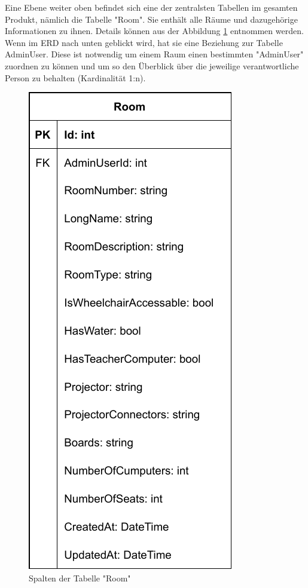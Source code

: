 
Eine Ebene weiter oben befindet sich eine der zentralsten Tabellen im gesamten Produkt, nämlich die Tabelle "Room". Sie enthält alle Räume und dazugehörige Informationen zu ihnen. Details können aus der Abbildung \ref{fig:RoomTableColls} entnommen werden. Wenn im ERD nach unten geblickt wird, hat sie eine Beziehung zur Tabelle AdminUser. Diese ist notwendig um einem Raum einen bestimmten "AdminUser" zuordnen zu können und um so den Überblick über die jeweilige verantwortliche Person zu behalten (Kardinalität 1:n).

\begin{figure}[H]
    \centering
    \includegraphics{media/MariaDB/Room.svg.pdf}
    \caption{Spalten der Tabelle "Room"}
    \label{fig:RoomTableColls}
\end{figure}

